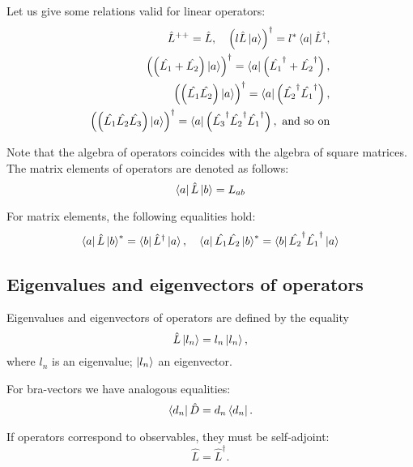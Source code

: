 Let us give some relations valid for linear 
operators:
\begin{eqnarray}
\hat{L}^{++} = \hat{L}, \quad
\left(l \hat{L} \ket{ a } \right)^{\dag} = 
l^{*} \bra{ a } \hat{L}^{\dag}, 
\nonumber \\
\left(\left(\hat{L_1} + \hat{L_2} \right) \ket{ a } \right)^{\dag} = 
\bra{ a } \left(\hat{L_1}^{\dag} + \hat{L_2}^\dag \right), 
\nonumber \\
\left(\left(\hat{L_1} \hat{L_2} \right) \ket{ a } \right)^{\dag} = 
\bra{ a } \left(\hat{L_2}^{\dag} \hat{L_1}^\dag \right),
\nonumber \\
\left(\left(\hat{L_1} \hat{L_2} \hat{L_3}\right) \ket{ a } \right)^{\dag} = 
\bra{ a } \left(\hat{L_3}^{\dag} \hat{L_2}^\dag \hat{L_1}^\dag \right), 
\mbox{ and so on}
\label{eqAddDirac_propert}
\end{eqnarray}

Note that the algebra of operators coincides with the algebra of square matrices. The matrix elements of operators are denoted as follows: 
\begin{equation}
\bra{a}\hat{L}\ket{b} = L_{ab}
\end{equation}

For matrix elements, the following equalities hold:
\begin{equation}
\bra{a}\hat{L}\ket{b}^{*} = 
\bra{b}\hat{L}^{\dag}\ket{a}, \quad
\bra{a}\hat{L_1}\hat{L_2}\ket{b}^{*} = 
\bra{b}\hat{L_2}^{\dag}\hat{L_1}^\dag\ket{a}
\end{equation}


\subsection{Eigenvalues and eigenvectors of operators} 
Eigenvalues and eigenvectors of operators are defined by the equality
\begin{equation}
\hat{L} \ket{l_n} = l_n \ket{l_n},
\end{equation}
where $l_n$ is an eigenvalue; $\ket{l_n}$ an eigenvector.

For bra-vectors we have analogous equalities:
\begin{equation}
\bra{d_n} \hat{D}  = d_n \bra{d_n}.
\end{equation}

If operators correspond to observables, they must be self-adjoint:
\begin{equation}
\hat{L}  = \hat{L}^{\dag}.
\label{eqAddDirac_ermit}
\end{equation}

